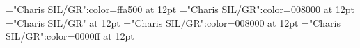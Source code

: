 \documentclass[a4paper]{article}
\begin{document}
\pagestyle{plain}
\sloppy
\setlength{\parfillskip}{0pt plus 1fil}
\font\xitemen="Charis SIL/GR":color=ffa500 at 12pt
\font\xitemenxitem="Charis SIL/GR":color=008000 at 12pt
\font\main="Charis SIL/GR" at 12pt
\font\xitemenmain="Charis SIL/GR":color=008000 at 12pt
\font\xitemmain="Charis SIL/GR":color=0000ff at 12pt

\mbox{} 
\newpage 
\newpage 
\setcounter{page}{1} 
\pagestyle{fancy} 








\end{document}

